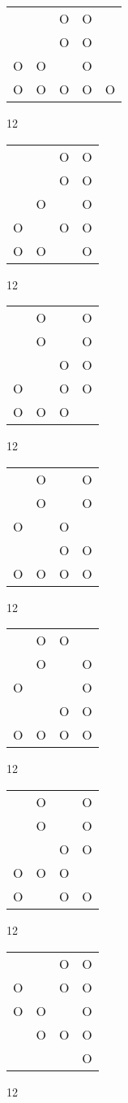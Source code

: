 \begin{tabular}{|m{0.2cm}m{0.2cm}m{0.2cm}m{0.2cm}m{0.2cm}|}\hline
 & &O&O& \\
 & &O&O& \\
O&O& &O& \\
O&O&O&O&O\\
\hline\end{tabular}12
\begin{tabular}{|m{0.2cm}m{0.2cm}m{0.2cm}m{0.2cm}|}\hline
 & &O&O\\
 & &O&O\\
 &O& &O\\
O& &O&O\\
O&O& &O\\
\hline\end{tabular}12
\begin{tabular}{|m{0.2cm}m{0.2cm}m{0.2cm}m{0.2cm}|}\hline
 &O& &O\\
 &O& &O\\
 & &O&O\\
O& &O&O\\
O&O&O& \\
\hline\end{tabular}12
\begin{tabular}{|m{0.2cm}m{0.2cm}m{0.2cm}m{0.2cm}|}\hline
 &O& &O\\
 &O& &O\\
O& &O& \\
 & &O&O\\
O&O&O&O\\
\hline\end{tabular}12
\begin{tabular}{|m{0.2cm}m{0.2cm}m{0.2cm}m{0.2cm}|}\hline
 &O&O& \\
 &O& &O\\
O& & &O\\
 & &O&O\\
O&O&O&O\\
\hline\end{tabular}12
\begin{tabular}{|m{0.2cm}m{0.2cm}m{0.2cm}m{0.2cm}|}\hline
 &O& &O\\
 &O& &O\\
 & &O&O\\
O&O&O& \\
O& &O&O\\
\hline\end{tabular}12
\begin{tabular}{|m{0.2cm}m{0.2cm}m{0.2cm}m{0.2cm}|}\hline
 & &O&O\\
O& &O&O\\
O&O& &O\\
 &O&O&O\\
 & & &O\\
\hline\end{tabular}12

